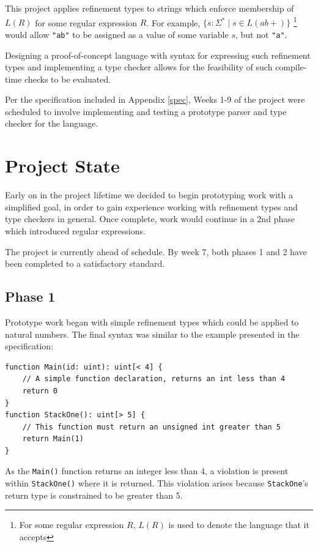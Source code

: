 \documentclass[a4paper]{article}
\begin{document}
    This project applies refinement types to strings which enforce membership of $L(R)$ for some regular expression $R$. For example, $\{s: \Sigma^* \mid s \in L(ab+)\}$ \footnote{For some regular expression $R$, $L(R)$ is used to denote the language that it accepts} would allow \texttt{"ab"} to be assigned as a value of some variable $s$, but not \texttt{"a"}.
    
    Designing a proof-of-concept language with syntax for expressing such refinement types and implementing a type checker allows for the feasibility of such compile-time checks to be evaluated.

    Per the specification included in Appendix \ref{spec}, Weeks 1-9 of the project were scheduled to involve implementing and testing a prototype parser and type checker for the language.
    
    \section{Project State}
    
    Early on in the project lifetime we decided to begin prototyping work with a simplified goal, in order to gain experience working with refinement types and type checkers in general. Once complete, work would continue in a 2nd phase which introduced regular expressions.
    
    The project is currently ahead of schedule. By week 7, both phases 1 and 2 have been completed to a satisfactory standard.
    
    \subsection*{Phase 1}\hfill
    
    Prototype work began with simple refinement types which could be applied to natural numbers. The final syntax was similar to the example presented in the specification:
    
    \begin{verbatim}
function Main(id: uint): uint[< 4] {
    // A simple function declaration, returns an int less than 4
    return 0
}
function StackOne(): uint[> 5] {
    // This function must return an unsigned int greater than 5
    return Main(1)
}
    \end{verbatim}
    
    As the \texttt{Main()} function returns an integer less than 4, a violation is present within \texttt{StackOne()} where it is returned. This violation arises because \texttt{StackOne}'s return type is constrained to be greater than 5.
    
\end{document}
